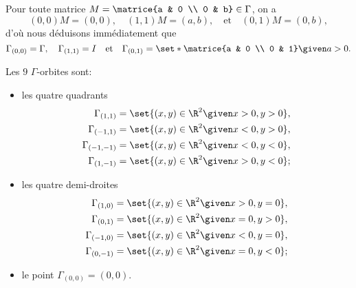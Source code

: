 Pour toute matrice $M = \matrice{a & 0 \\ 0 & b}\in\Gamma$, on a
\[
  (0,0) M = (0,0),
  \quad
  (1,1) M = (a,b),
  \quad\text{et}\quad
  (0,1) M = (0,b),
\]
%
d'où nous déduisons immédiatement que
\[
  \Gamma_{(0,0)} = \Gamma,
  \quad
  \Gamma_{(1,1)} = I
  \quad\text{et}\quad
  \Gamma_{(0,1)} = \set*{\matrice{a & 0 \\ 0 & 1} \given a > 0}.
\]

Les $9$ $\Gamma$-orbites sont:

\begin{itemize}
  \item
    les quatre quadrants
    \begin{align*}
      \Gamma_{(1,1)}   &= \set{(x,y)\in\R^2 \given x > 0, y > 0}, \\
      \Gamma_{(-1,1)}  &= \set{(x,y)\in\R^2 \given x < 0, y > 0}, \\
      \Gamma_{(-1,-1)} &= \set{(x,y)\in\R^2 \given x < 0, y < 0}, \\
      \Gamma_{(1,-1)}  &= \set{(x,y)\in\R^2 \given x > 0, y < 0};
    \end{align*}

  \item
    les quatre demi-droites
    \begin{align*}
      \Gamma_{(1,0)} &= \set{(x,y)\in\R^2 \given x > 0, y = 0}, \\
      \Gamma_{(0,1)} &= \set{(x,y)\in\R^2 \given x = 0, y > 0}, \\
      \Gamma_{(-1,0)} &= \set{(x,y)\in\R^2 \given x < 0, y = 0}, \\
      \Gamma_{(0,-1)} &= \set{(x,y)\in\R^2 \given x = 0, y < 0}; \\
    \end{align*}

  \item
    le point $\Gamma_{(0,0)} = {(0,0)}$.
\end{itemize}
